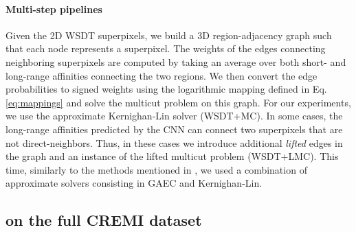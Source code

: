 \paragraph{Multi-step pipelines} Given the 2D WSDT superpixels, we build a 3D region-adjacency graph such that each node represents a superpixel. The weights of the edges connecting neighboring superpixels are computed by taking an average over both short- and long-range affinities connecting the two regions. We then convert the edge probabilities to signed weights using the logarithmic mapping defined in Eq. \ref{eq:mappings} and solve the multicut problem on this graph. For our experiments, we use the approximate Kernighan-Lin solver \cite{keuper2015efficient,kernighan1970efficient} (WSDT+MC). In some cases, the long-range affinities predicted by the CNN can connect two superpixels that are not direct-neighbors. Thus, in these cases we introduce additional \emph{lifted} edges in the graph and an instance of the lifted multicut problem (WSDT+LMC). This time, similarly to the methods mentioned in \cite{beier2016efficient}, we used a combination of approximate solvers consisting in GAEC and Kernighan-Lin. 

\subsection{\algname{} on the full CREMI dataset} \label{sec:appendix_exps_full_cremi}
